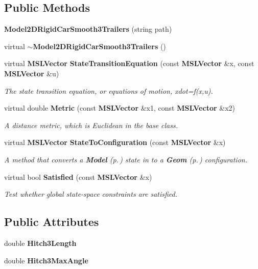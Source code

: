 \subsection*{Public Methods}
\begin{CompactItemize}
\item 
{\bf Model2DRigid\-Car\-Smooth3Trailers} (string path)
\item 
virtual {\bf $\sim$Model2DRigid\-Car\-Smooth3Trailers} ()
\item 
virtual {\bf MSLVector} {\bf State\-Transition\-Equation} (const {\bf MSLVector} \&x, const {\bf MSLVector} \&u)
\begin{CompactList}\small\item\em The state transition equation, or equations of motion, xdot=f(x,u).\item\end{CompactList}\item 
virtual double {\bf Metric} (const {\bf MSLVector} \&x1, const {\bf MSLVector} \&x2)
\begin{CompactList}\small\item\em A distance metric, which is Euclidean in the base class.\item\end{CompactList}\item 
virtual {\bf MSLVector} {\bf State\-To\-Configuration} (const {\bf MSLVector} \&x)
\begin{CompactList}\small\item\em A method that converts a {\bf Model} {\rm (p.\,\pageref{class_Model})} state in to a {\bf Geom} {\rm (p.\,\pageref{class_Geom})} configuration.\item\end{CompactList}\item 
virtual bool {\bf Satisfied} (const {\bf MSLVector} \&x)
\begin{CompactList}\small\item\em Test whether global state-space constraints are satisfied.\item\end{CompactList}\end{CompactItemize}
\subsection*{Public Attributes}
\begin{CompactItemize}
\item 
double {\bf Hitch3Length}
\item 
double {\bf Hitch3Max\-Angle}
\end{CompactItemize}


